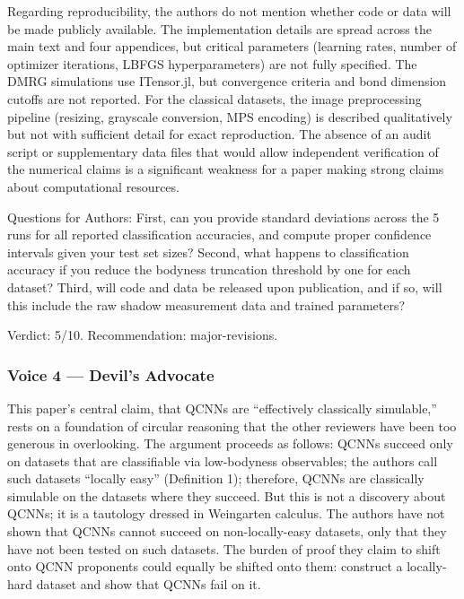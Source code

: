 \documentclass[10pt,letterpaper]{article}
\begin{document}
Regarding reproducibility, the authors do not mention whether code or data will be made publicly available. The implementation details are spread across the main text and four appendices, but critical parameters (learning rates, number of optimizer iterations, LBFGS hyperparameters) are not fully specified. The DMRG simulations use ITensor.jl, but convergence criteria and bond dimension cutoffs are not reported. For the classical datasets, the image preprocessing pipeline (resizing, grayscale conversion, MPS encoding) is described qualitatively but not with sufficient detail for exact reproduction. The absence of an audit script or supplementary data files that would allow independent verification of the numerical claims is a significant weakness for a paper making strong claims about computational resources.

Questions for Authors: First, can you provide standard deviations across the 5 runs for all reported classification accuracies, and compute proper confidence intervals given your test set sizes? Second, what happens to classification accuracy if you reduce the bodyness truncation threshold by one for each dataset? Third, will code and data be released upon publication, and if so, will this include the raw shadow measurement data and trained parameters?

Verdict: 5/10. Recommendation: major-revisions.

\hypertarget{voice-4-devils-advocate}{%
\subsubsection{Voice 4 --- Devil's Advocate}\label{voice-4-devils-advocate}}

This paper's central claim, that QCNNs are ``effectively classically simulable,'' rests on a foundation of circular reasoning that the other reviewers have been too generous in overlooking. The argument proceeds as follows: QCNNs succeed only on datasets that are classifiable via low-bodyness observables; the authors call such datasets ``locally easy'' (Definition 1); therefore, QCNNs are classically simulable on the datasets where they succeed. But this is not a discovery about QCNNs; it is a tautology dressed in Weingarten calculus. The authors have not shown that QCNNs cannot succeed on non-locally-easy datasets, only that they have not been tested on such datasets. The burden of proof they claim to shift onto QCNN proponents could equally be shifted onto them: construct a locally-hard dataset and show that QCNNs fail on it.
\end{document}
